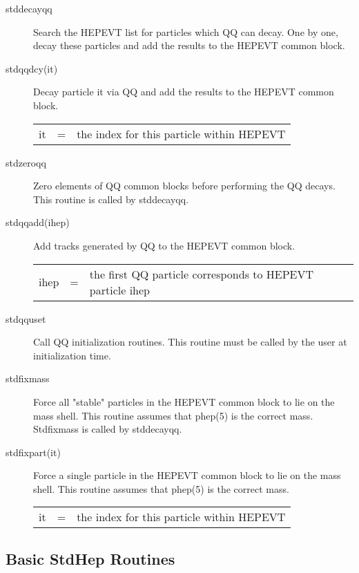 \begin{description}
\item[stddecayqq] 
 Search the HEPEVT list for particles which QQ can decay.  One by one, 
 decay these particles and add the results to the HEPEVT common block.

\item[stdqqdcy(it)] 
  Decay particle it via QQ and add the results to the HEPEVT common block.

\begin{tabular}{lcl}
it & = & the index for this particle within HEPEVT \\
\end{tabular}

\item[stdzeroqq] 
 Zero elements of QQ common blocks before performing the QQ decays.
 This routine is called by stddecayqq.

\item[stdqqadd(ihep)]
 Add tracks generated by QQ to the HEPEVT common block.

\begin{tabular}{lcl}
ihep & = & the first QQ particle corresponds to HEPEVT particle ihep \\
\end{tabular}

\item[stdqquset]
 Call QQ initialization routines.
 This routine must be called by the user at initialization time.

\item[stdfixmass]
 Force all "stable" particles in the HEPEVT common block to lie on the mass shell.
 This routine assumes that phep(5) is the correct mass.  
 Stdfixmass is called by stddecayqq.

\item[stdfixpart(it)]
 Force a single particle in the HEPEVT common block to lie on the mass shell.
 This routine assumes that phep(5) is the correct mass.  

\begin{tabular}{lcl}
it & = & the index for this particle within HEPEVT \\
\end{tabular}

\end{description}


\subsection{Basic StdHep Routines}

